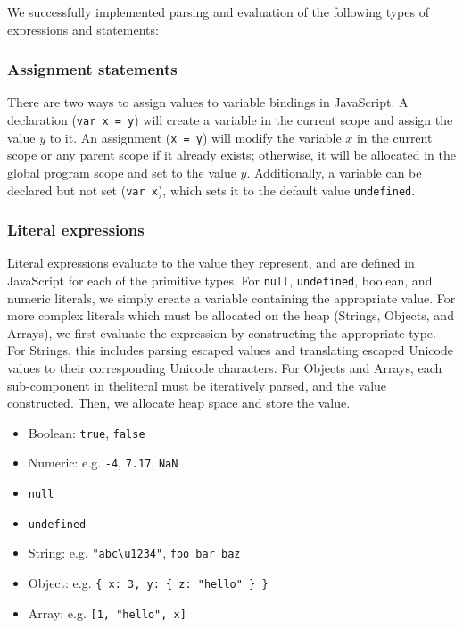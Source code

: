 \documentclass{article}
\begin{document}
\begin{multicols}{2}
We successfully implemented parsing and evaluation of the following types of
expressions and statements:

\subsubsection*{Assignment statements}

There are two ways to assign values to variable bindings in JavaScript. A
declaration (\texttt{var x = y}) will create a variable in the current scope and
assign the value $y$ to it. An assignment (\texttt{x = y}) will modify the
variable $x$ in the current scope or any parent scope if it already exists;
otherwise, it will be allocated in the global program scope and set to the value
$y$. Additionally, a variable can be declared but not set (\texttt{var x}),
which sets it to the default value \texttt{undefined}.

\subsubsection*{Literal expressions}

Literal expressions evaluate to the value they represent, and are defined in
JavaScript for each of the primitive types. For \texttt{null},
\texttt{undefined}, boolean, and numeric literals, we simply create a variable
containing the appropriate value. For more complex literals which must be
allocated on the heap (Strings, Objects, and Arrays), we first evaluate the
expression by constructing the appropriate type. For Strings, this includes
parsing escaped values and translating escaped Unicode values to their
corresponding Unicode characters. For Objects and Arrays, each sub-component in
theliteral must be iteratively parsed, and the value constructed. Then, we
allocate heap space and store the value.

\begin{itemize}
  \item Boolean: \texttt{true}, \texttt{false}
  \item Numeric: e.g. \texttt{-4}, \texttt{7.17}, \texttt{NaN}
  \item \texttt{null}
  \item \texttt{undefined}
  \item String: e.g. \texttt{"abc\textbackslash u1234"},
    \texttt{\textquotesingle foo bar baz\textquotesingle}
  \item Object: e.g. \texttt{\{ x: 3, y: \{ z: "hello" \} \} }
  \item Array: e.g. \texttt{[1, "hello", x]}
\end{itemize}


\end{multicols}
\end{document}
